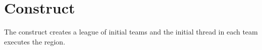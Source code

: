 
%
%
%
%
%
%
%
%
%
%
%
%
%


\section{ Construct}
\label{sec:teams Construct}
\summary
The  construct creates a league of initial teams and the initial thread in each
team executes the region.

